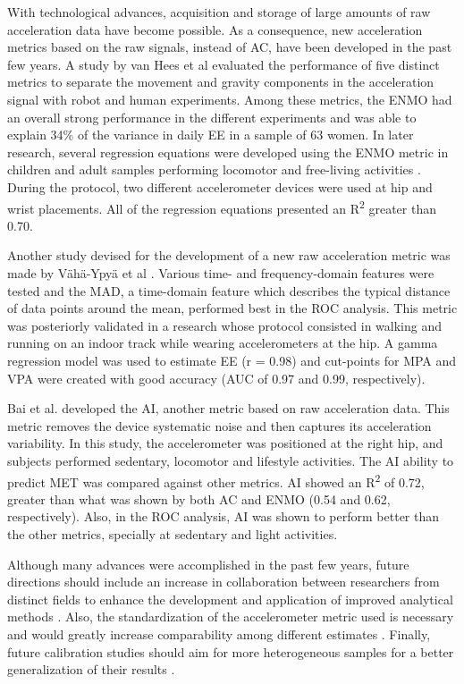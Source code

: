\documentclass[12pt]{article}
\begin{document}
With technological advances, acquisition and storage of large amounts of raw acceleration data have become possible. As a consequence, new acceleration metrics based on the raw signals, instead of AC, have been developed in the past few years. A study by van Hees et al  evaluated the performance of five distinct metrics to separate the movement and gravity components in the acceleration signal with robot and human experiments. Among these metrics, the ENMO had an overall strong performance in the different experiments and was able to explain 34\% of the variance in daily EE in a sample of 63 women. In later research, several regression equations were developed using the ENMO metric in children and adult samples performing locomotor and free-living activities . During the protocol, two different accelerometer devices were used at hip and wrist placements. All of the regression equations presented an R\textsuperscript{2} greater than 0.70.

Another study devised for the development of a new raw acceleration metric was made by V{\"a}h{\"a}-Ypy{\"a} et al . Various time- and frequency-domain features were tested and the MAD, a time-domain feature which describes the typical distance of data points around the mean, performed best in the ROC analysis. This metric was posteriorly validated in a research  whose protocol consisted in walking and running on an indoor track while wearing accelerometers at the hip. A gamma regression model was used to estimate EE (r = 0.98) and cut-points for MPA and VPA were created with good accuracy (AUC of 0.97 and 0.99, respectively).

Bai et al.  developed the AI, another metric based on raw acceleration data. This metric removes the device systematic noise and then captures its acceleration variability. In this study, the accelerometer was positioned at the right hip, and subjects performed sedentary, locomotor and lifestyle activities. The AI ability to predict MET was compared against other metrics. AI showed an R\textsuperscript{2} of 0.72, greater than what was shown by both AC and ENMO (0.54 and 0.62, respectively). Also, in the ROC analysis, AI was shown to perform better than the other metrics, specially at sedentary and light activities. 

Although many advances were accomplished in the past few years, future directions should include an increase in collaboration between researchers from distinct fields to enhance the development and application of improved analytical methods . Also, the standardization of the accelerometer metric used is necessary and would greatly increase comparability among different estimates . Finally, future calibration studies should aim for more heterogeneous samples for a better generalization of their results .
\end{document}
